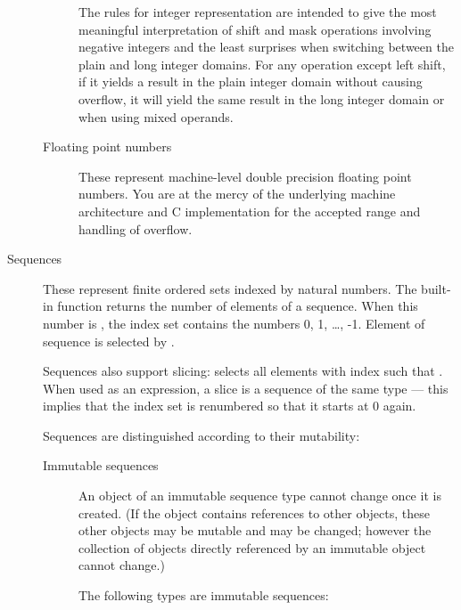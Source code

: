 \begin{description}
\begin{description}
The rules for integer representation are intended to give the most
meaningful interpretation of shift and mask operations involving
negative integers and the least surprises when switching between the
plain and long integer domains.  For any operation except left shift,
if it yields a result in the plain integer domain without causing
overflow, it will yield the same result in the long integer domain or
when using mixed operands.

\item[Floating point numbers]
These represent machine-level double precision floating point numbers.  
You are at the mercy of the underlying machine architecture and
C implementation for the accepted range and handling of overflow.

\end{description} %

\item[Sequences]
These represent finite ordered sets indexed by natural numbers.
The built-in function  returns the
number of elements of a sequence.  When this number is , the
index set contains the numbers 0, 1, \ldots, -1.  Element
 of sequence  is selected by .

Sequences also support slicing: 
selects all elements with index  such that  \code{<=}
 \code{<} .  When used as an expression, a slice is a
sequence of the same type --- this implies that the index set is
renumbered so that it starts at 0 again.

Sequences are distinguished according to their mutability:

\begin{description}
%
\item[Immutable sequences]
An object of an immutable sequence type cannot change once it is
created.  (If the object contains references to other objects,
these other objects may be mutable and may be changed; however
the collection of objects directly referenced by an immutable object
cannot change.)

The following types are immutable sequences:

\begin{description}


\end{description}
\end{description}
\end{description}
